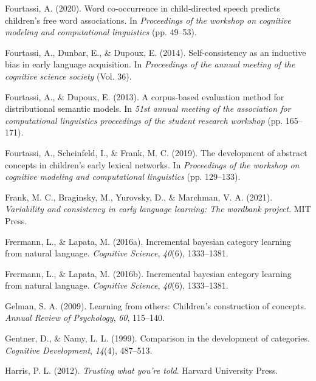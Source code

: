 \documentclass[english,,man]{apa6}
\begin{document}
\leavevmode\hypertarget{ref-fourtassi2020word}{}%
Fourtassi, A. (2020). Word co-occurrence in child-directed speech predicts children's free word associations. In \emph{Proceedings of the workshop on cognitive modeling and computational linguistics} (pp. 49--53).

\leavevmode\hypertarget{ref-fourtassi2014}{}%
Fourtassi, A., Dunbar, E., \& Dupoux, E. (2014). Self-consistency as an inductive bias in early language acquisition. In \emph{Proceedings of the annual meeting of the cognitive science society} (Vol. 36).

\leavevmode\hypertarget{ref-fourtassi2013}{}%
Fourtassi, A., \& Dupoux, E. (2013). A corpus-based evaluation method for distributional semantic models. In \emph{51st annual meeting of the association for computational linguistics proceedings of the student research workshop} (pp. 165--171).

\leavevmode\hypertarget{ref-fourtassi2019}{}%
Fourtassi, A., Scheinfeld, I., \& Frank, M. C. (2019). The development of abstract concepts in children's early lexical networks. In \emph{Proceedings of the workshop on cognitive modeling and computational linguistics} (pp. 129--133).

\leavevmode\hypertarget{ref-frank2021variability}{}%
Frank, M. C., Braginsky, M., Yurovsky, D., \& Marchman, V. A. (2021). \emph{Variability and consistency in early language learning: The wordbank project}. MIT Press.

\leavevmode\hypertarget{ref-frermann2016}{}%
Frermann, L., \& Lapata, M. (2016a). Incremental bayesian category learning from natural language. \emph{Cognitive Science}, \emph{40}(6), 1333--1381.

\leavevmode\hypertarget{ref-frermann2016incremental}{}%
Frermann, L., \& Lapata, M. (2016b). Incremental bayesian category learning from natural language. \emph{Cognitive Science}, \emph{40}(6), 1333--1381.

\leavevmode\hypertarget{ref-gelman2009}{}%
Gelman, S. A. (2009). Learning from others: Children's construction of concepts. \emph{Annual Review of Psychology}, \emph{60}, 115--140.

\leavevmode\hypertarget{ref-gentner1999comparison}{}%
Gentner, D., \& Namy, L. L. (1999). Comparison in the development of categories. \emph{Cognitive Development}, \emph{14}(4), 487--513.

\leavevmode\hypertarget{ref-harris2012}{}%
Harris, P. L. (2012). \emph{Trusting what you're told}. Harvard University Press.
\end{document}
